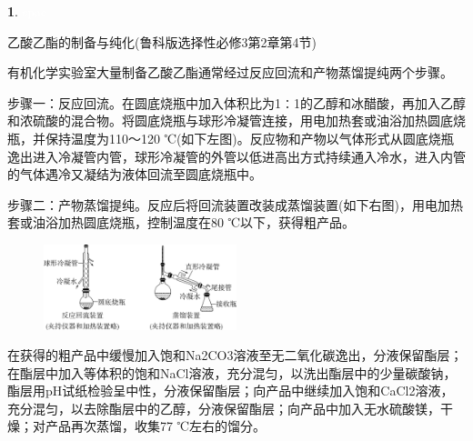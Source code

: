 \documentclass[UTF8, 10pt, a4paper, oneside]{ctexart}
\newcommand{\hei}[1]{{\heiti #1}}%
\theoremstyle{definition}
\newtheorem{subexercise}{}[exercise]%
\theoremstyle{remark}
\theoremstyle{plain}
\begin{document}
\begin{subexercise}\textcolor{white}{spac}
    \begin{center}
        \hei{乙酸乙酯的制备与纯化(鲁科版选择性必修3第2章第4节)}
    \end{center}
    {\kaishu
    有机化学实验室大量制备乙酸乙酯通常经过反应回流和产物蒸馏提纯两个步骤。

    步骤一：反应回流。在圆底烧瓶中加入体积比为1∶1的乙醇和冰醋酸，再加入乙醇和浓硫酸的混合物。将圆底烧瓶与球形冷凝管连接，用电加热套或油浴加热圆底烧瓶，并保持温度为110～120 ℃(如下左图)。反应物和产物以气体形式从圆底烧瓶逸出进入冷凝管内管，球形冷凝管的外管以低进高出方式持续通入冷水，进入内管的气体遇冷又凝结为液体回流至圆底烧瓶中。

    步骤二：产物蒸馏提纯。反应后将回流装置改装成蒸馏装置(如下右图)，用电加热套或油浴加热圆底烧瓶，控制温度在80 ℃以下，获得粗产品。
    \begin{figure}[h!]
        \centering
        \includegraphics[width=0.5\textwidth]{assists/image13.png}
    \end{figure}

    在获得的粗产品中缓慢加入饱和Na2CO3溶液至无二氧化碳逸出，分液保留酯层；在酯层中加入等体积的饱和NaCl溶液，充分混匀，以洗出酯层中的少量碳酸钠，酯层用pH试纸检验呈中性，分液保留酯层；向产品中继续加入饱和CaCl2溶液，充分混匀，以去除酯层中的乙醇，分液保留酯层；向产品中加入无水硫酸镁，干燥；对产品再次蒸馏，收集77 ℃左右的馏分。
    }
\end{subexercise}
\end{document}
